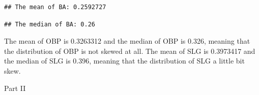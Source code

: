 \documentclass[
]{article}
\newenvironment{Shaded}{\begin{snugshade}}{\end{snugshade}}
\newcommand{\CommentTok}[1]{\textcolor[rgb]{0.56,0.35,0.01}{\textit{#1}}}
\newcommand{\FunctionTok}[1]{\textcolor[rgb]{0.00,0.00,0.00}{#1}}
\newcommand{\NormalTok}[1]{#1}
\newcommand{\OtherTok}[1]{\textcolor[rgb]{0.56,0.35,0.01}{#1}}
\newcommand{\SpecialCharTok}[1]{\textcolor[rgb]{0.00,0.00,0.00}{#1}}
\newcommand{\StringTok}[1]{\textcolor[rgb]{0.31,0.60,0.02}{#1}}
\begin{document}
\begin{Shaded}
\end{Shaded}

\begin{verbatim}
## The mean of BA: 0.2592727
\end{verbatim}

\begin{Shaded}
\end{Shaded}

\begin{verbatim}
## The median of BA: 0.26
\end{verbatim}

The mean of OBP is 0.3263312 and the median of OBP is 0.326, meaning
that the distribution of OBP is not skewed at all. The mean of SLG is
0.3973417 and the median of SLG is 0.396, meaning that the distribution
of SLG a little bit skew.

Part II
\end{document}
